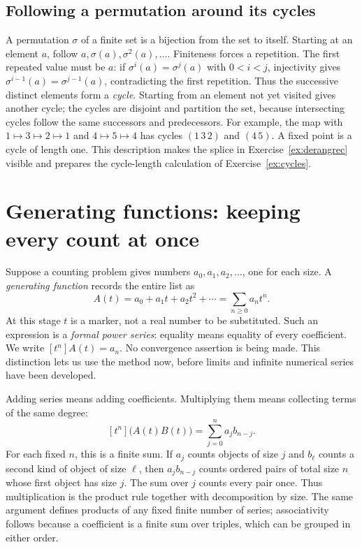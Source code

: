\subsection*{Following a permutation around its cycles}
A permutation $\sigma$ of a finite set is a bijection from the set to itself. Starting at an element $a$, follow $a,\sigma(a),\sigma^2(a),\dots$. Finiteness forces a repetition. The first repeated value must be $a$: if $\sigma^i(a)=\sigma^j(a)$ with $0<i<j$, injectivity gives $\sigma^{i-1}(a)=\sigma^{j-1}(a)$, contradicting the first repetition. Thus the successive distinct elements form a \emph{cycle}. Starting from an element not yet visited gives another cycle; the cycles are disjoint and partition the set, because intersecting cycles follow the same successors and predecessors. For example, the map with $1\mapsto3\mapsto2\mapsto1$ and $4\mapsto5\mapsto4$ has cycles $(1\,3\,2)$ and $(4\,5)$. A fixed point is a cycle of length one. This description makes the splice in Exercise~\ref{ex:derangrec} visible and prepares the cycle-length calculation of Exercise~\ref{ex:cycles}.


\section{Generating functions: keeping every count at once}
Suppose a counting problem gives numbers $a_0,a_1,a_2,\dots$, one for each size. A \emph{generating function} records the entire list as
\[
A(t)=a_0+a_1t+a_2t^2+\cdots=\sum_{n\ge0}a_nt^n.
\]
At this stage $t$ is a marker, not a real number to be substituted. Such an expression is a \emph{formal power series}: equality means equality of every coefficient. We write $[t^n]A(t)=a_n$. No convergence assertion is being made. This distinction lets us use the method now, before limits and infinite numerical series have been developed.

Adding series means adding coefficients. Multiplying them means collecting terms of the same degree:
\[
[t^n]\bigl(A(t)B(t)\bigr)=\sum_{j=0}^na_jb_{n-j}.
\]
For each fixed $n$, this is a finite sum. If $a_j$ counts objects of size $j$ and $b_\ell$ counts a second kind of object of size $\ell$, then $a_jb_{n-j}$ counts ordered pairs of total size $n$ whose first object has size $j$. The sum over $j$ counts every pair once. Thus multiplication is the product rule together with decomposition by size. The same argument defines products of any fixed finite number of series; associativity follows because a coefficient is a finite sum over triples, which can be grouped in either order.

